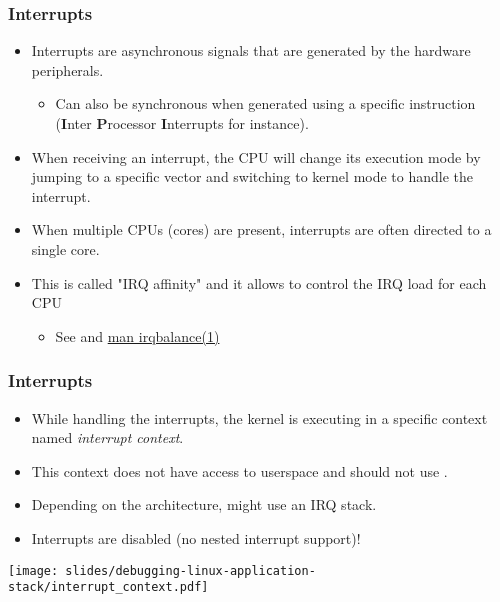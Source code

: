 \begin{frame}
  \frametitle{Interrupts}
  \begin{itemize}
    \item Interrupts are asynchronous signals that are generated by the hardware
          peripherals.
    \begin{itemize}
      \item Can also be synchronous when generated using a specific instruction
            ({\bf I}nter {\bf P}rocessor {\bf I}nterrupts for instance).
    \end{itemize}
    \item When receiving an interrupt, the CPU will change its execution mode by
          jumping to a specific vector and switching to kernel mode to handle the
          interrupt.
    \item When multiple CPUs (cores) are present, interrupts are often directed
          to a single core.
    \item This is called "IRQ affinity" and it allows to control the IRQ load for
          each CPU
    \begin{itemize}
      \item See  and
            \href{https://manpages.org/irqbalance/1}{man irqbalance(1)}
    \end{itemize}
  \end{itemize}
\end{frame}

\begin{frame}
  \frametitle{Interrupts}
  \begin{itemize}
    \item While handling the interrupts, the kernel is executing in a
          specific context named {\em interrupt context}.
    \item This context does not have access to userspace and should not use
          .
    \item Depending on the architecture, might use an IRQ stack.
    \item Interrupts are disabled (no nested interrupt support)!
  \end{itemize}
  \begin{center}
    \texttt{[image: slides/debugging-linux-application-stack/interrupt\_context.pdf]}
  \end{center}
\end{frame}

